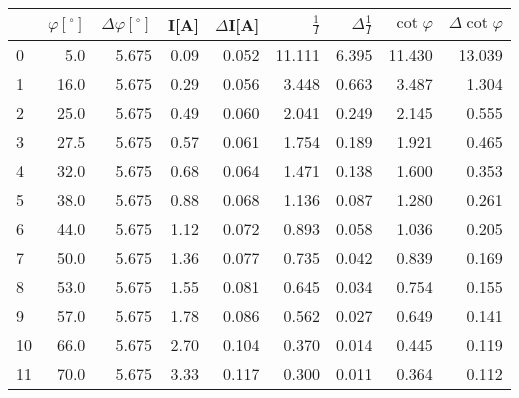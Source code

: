 \begin{tabular}{lrrrrrrrr}
\toprule
{} &  $\varphi[^\circ]$ &  $\Delta \varphi[^\circ]$ &  I[A] &  $\Delta$I[A] &  $\frac{1}{I}$ &  $\Delta \frac{1}{I}$ &  $\cot{\varphi}$ &  $\Delta \cot{\varphi}$ \\
\midrule
0  &                5.0 &                     5.675 &  0.09 &         0.052 &         11.111 &                 6.395 &           11.430 &                  13.039 \\
1  &               16.0 &                     5.675 &  0.29 &         0.056 &          3.448 &                 0.663 &            3.487 &                   1.304 \\
2  &               25.0 &                     5.675 &  0.49 &         0.060 &          2.041 &                 0.249 &            2.145 &                   0.555 \\
3  &               27.5 &                     5.675 &  0.57 &         0.061 &          1.754 &                 0.189 &            1.921 &                   0.465 \\
4  &               32.0 &                     5.675 &  0.68 &         0.064 &          1.471 &                 0.138 &            1.600 &                   0.353 \\
5  &               38.0 &                     5.675 &  0.88 &         0.068 &          1.136 &                 0.087 &            1.280 &                   0.261 \\
6  &               44.0 &                     5.675 &  1.12 &         0.072 &          0.893 &                 0.058 &            1.036 &                   0.205 \\
7  &               50.0 &                     5.675 &  1.36 &         0.077 &          0.735 &                 0.042 &            0.839 &                   0.169 \\
8  &               53.0 &                     5.675 &  1.55 &         0.081 &          0.645 &                 0.034 &            0.754 &                   0.155 \\
9  &               57.0 &                     5.675 &  1.78 &         0.086 &          0.562 &                 0.027 &            0.649 &                   0.141 \\
10 &               66.0 &                     5.675 &  2.70 &         0.104 &          0.370 &                 0.014 &            0.445 &                   0.119 \\
11 &               70.0 &                     5.675 &  3.33 &         0.117 &          0.300 &                 0.011 &            0.364 &                   0.112 \\
\bottomrule
\end{tabular}
